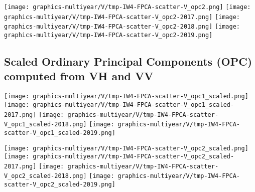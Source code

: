 \clearpage
\begin{center}
\begin{minipage}{7.0in}
\texttt{[image: graphics-multiyear/V/tmp-IW4-FPCA-scatter-V\_opc2.png]}
\quad
\texttt{[image: graphics-multiyear/V/tmp-IW4-FPCA-scatter-V\_opc2-2017.png]}
\vskip 1.0cm
\texttt{[image: graphics-multiyear/V/tmp-IW4-FPCA-scatter-V\_opc2-2018.png]}
\quad
\texttt{[image: graphics-multiyear/V/tmp-IW4-FPCA-scatter-V\_opc2-2019.png]}
\end{minipage}
\end{center}


\clearpage

\subsection{Scaled Ordinary Principal Components (OPC) computed from VH and VV}
\label{FPCA-scatter-opc-scaled}

\begin{center}
\begin{minipage}{7.0in}
\texttt{[image: graphics-multiyear/V/tmp-IW4-FPCA-scatter-V\_opc1\_scaled.png]}
\quad
\texttt{[image: graphics-multiyear/V/tmp-IW4-FPCA-scatter-V\_opc1\_scaled-2017.png]}
\vskip 1.0cm
\texttt{[image: graphics-multiyear/V/tmp-IW4-FPCA-scatter-V\_opc1\_scaled-2018.png]}
\quad
\texttt{[image: graphics-multiyear/V/tmp-IW4-FPCA-scatter-V\_opc1\_scaled-2019.png]}
\end{minipage}
\end{center}


\clearpage
\begin{center}
\begin{minipage}{7.0in}
\texttt{[image: graphics-multiyear/V/tmp-IW4-FPCA-scatter-V\_opc2\_scaled.png]}
\quad
\texttt{[image: graphics-multiyear/V/tmp-IW4-FPCA-scatter-V\_opc2\_scaled-2017.png]}
\vskip 1.0cm
\texttt{[image: graphics-multiyear/V/tmp-IW4-FPCA-scatter-V\_opc2\_scaled-2018.png]}
\quad
\texttt{[image: graphics-multiyear/V/tmp-IW4-FPCA-scatter-V\_opc2\_scaled-2019.png]}
\end{minipage}
\end{center}


\renewcommand{\theenumi}{\roman{enumi}}
\renewcommand{\labelenumi}{\textnormal{(\theenumi)}$\;\;$}


